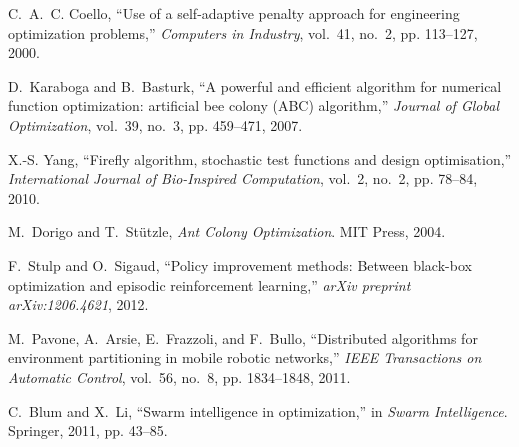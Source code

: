 \documentclass[conference]{IEEEtran}
\begin{document}
\begin{thebibliography}{99}
C.~A.~C. Coello, ``Use of a self-adaptive penalty approach for engineering optimization problems,'' \emph{Computers in Industry}, vol.~41, no.~2, pp. 113--127, 2000.

D.~Karaboga and B.~Basturk, ``A powerful and efficient algorithm for numerical function optimization: artificial bee colony (ABC) algorithm,'' \emph{Journal of Global Optimization}, vol.~39, no.~3, pp. 459--471, 2007.

X.-S. Yang, ``Firefly algorithm, stochastic test functions and design optimisation,'' \emph{International Journal of Bio-Inspired Computation}, vol.~2, no.~2, pp. 78--84, 2010.

M.~Dorigo and T.~Stützle, \emph{Ant Colony Optimization}. MIT Press, 2004.

F.~Stulp and O.~Sigaud, ``Policy improvement methods: Between black-box optimization and episodic reinforcement learning,'' \emph{arXiv preprint arXiv:1206.4621}, 2012.

M.~Pavone, A.~Arsie, E.~Frazzoli, and F.~Bullo, ``Distributed algorithms for environment partitioning in mobile robotic networks,'' \emph{IEEE Transactions on Automatic Control}, vol.~56, no.~8, pp. 1834--1848, 2011.

C.~Blum and X.~Li, ``Swarm intelligence in optimization,'' in \emph{Swarm Intelligence}. Springer, 2011, pp. 43--85.

\end{thebibliography}
\end{document}
